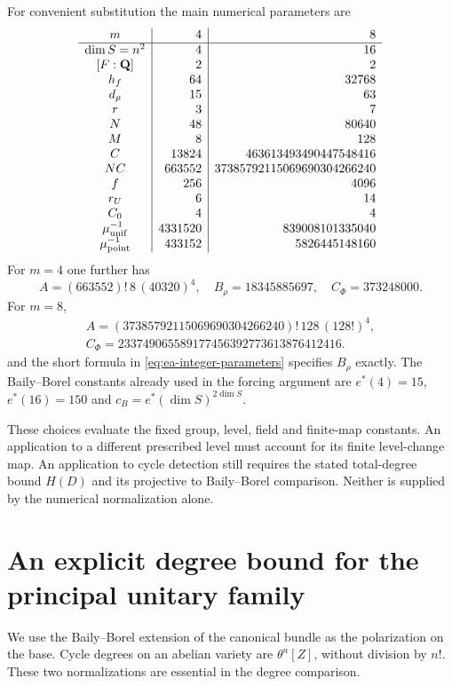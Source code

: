 \documentclass[11pt]{article}
\theoremstyle{definition}
\theoremstyle{remark}
\begin{document}
For convenient substitution the main numerical parameters are
\[
\begin{array}{c|r|r}
 m&4&8\\\hline
 \dim S=n^2&4&16\\
 {[F:\mathbf Q]}&2&2\\
 h_f&64&32768\\
 d_\rho&15&63\\
 r&3&7\\
 N&48&80640\\
 M&8&128\\
 C&13824&463613493490447548416\\
 NC&663552&37385792115069690304266240\\
 f&256&4096\\
 r_U&6&14\\
 C_0&4&4\\
 \mu^{-1}_{\rm unif}&4331520&839008101335040\\
 \mu^{-1}_{\rm point}&433152&5826445148160
\end{array}
\]
For $m=4$ one further has
\[
 A=(663552)!\,8\,(40320)^4,\quad
 B_\rho=18345885697,\quad C_\Phi=373248000.
\]
For $m=8$,
\[
 \begin{gathered}
 A=(37385792115069690304266240)!\,128\,(128!)^4,\\
 C_\Phi=233749065589177456392773613876412416.
 \end{gathered}
\]
and the short formula in \eqref{eq:ea-integer-parameters} specifies
$B_\rho$ exactly.  The Baily--Borel constants already used in the
forcing argument are $e^*(4)=15$, $e^*(16)=150$ and
$c_B=e^*(\dim S)^{2\dim S}$.

These choices evaluate the fixed group, level, field and finite-map
constants.  An application to a different prescribed level must account
for its finite level-change map.  An application to cycle detection
still requires the stated total-degree bound $H(D)$ and its projective
to Baily--Borel comparison.  Neither is supplied by the numerical
normalization alone.

\section{An explicit degree bound for the principal unitary family}
\label{sec:explicit-theta-chow-bound}

We use the Baily--Borel extension of the canonical bundle as the
polarization on the base.  Cycle degrees on an abelian variety are
$\theta^n[Z]$, without division by $n!$.  These two normalizations
are essential in the degree comparison.
\end{document}
